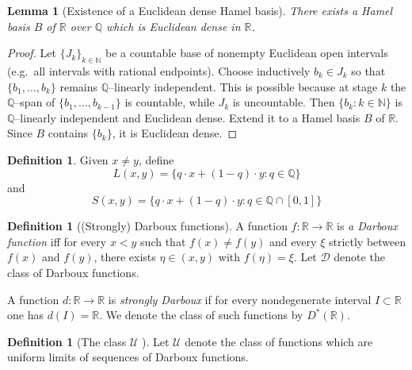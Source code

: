 \documentclass[11pt]{amsart} %
\newtheorem{lemma}[theorem]{Lemma}
\theoremstyle{definition}
\newtheorem{definition}[theorem]{Definition}
\newcommand{\R}{\mathbb{R}}
\newcommand{\U}{\mathcal{U}}
\newcommand{\Q}{\mathbb{Q}}
\begin{document}
\begin{lemma}[Existence of a Euclidean dense Hamel basis]\label{lem:dense-hamel-basis}
There exists a Hamel basis $B$ of $\R$ over $\Q$ which is Euclidean dense in $\R$.
\end{lemma}

\begin{proof}
Let $\{J_k\}_{k\in\mathbb N}$ be a countable base of nonempty Euclidean open intervals (e.g.\ all intervals with rational endpoints).
Choose inductively $b_k\in J_k$ so that $\{b_1,\dots,b_k\}$ remains $\Q$--linearly independent.
This is possible because at stage $k$ the $\Q$--span of $\{b_1,\dots,b_{k-1}\}$ is countable, while $J_k$ is uncountable.
Then $\{b_k:k\in\mathbb N\}$ is $\Q$--linearly independent and Euclidean dense. Extend it to a Hamel basis $B$ of $\R$.
Since $B$ contains $\{b_k\}$, it is Euclidean dense.
\end{proof}
\fi 

\begin{definition}
Given $x\neq y$, define
\begin{equation} 
L(x,y)=\{q\cdot x + (1-q)\cdot y: q\in \Q\}
\end{equation} 
and 
\begin{equation} 
S(x,y)=\{q\cdot x + (1-q)\cdot y: q\in \Q\cap [0,1]\}
\end{equation} 

\end{definition} 


\begin{definition}[(Strongly)  Darboux functions]

A function $f:\R\rightarrow \R$ is \emph{a Darboux function} iff for every $x<y$ such that $f(x)\neq f(y)$ and every $\xi$ strictly between $f(x)$ and $f(y)$, there exists $\eta \in (x,y)$ with $f(\eta)=\xi$.  Let $\mathcal{D}$
denote the class of Darboux functions. 

A function $d:\R\to\R$ is \emph{strongly Darboux} if for every nondegenerate interval
$I\subset\R$ one has $d(I)=\R$.
We denote the class of such functions by $D^*(\R)$.
\end{definition}

\begin{definition}[The class $\U$ {\cite{6}}]\label{def:U}
Let $\U$ denote the class of functions which are uniform limits of sequences of Darboux functions.
\end{definition}


\end{document}
